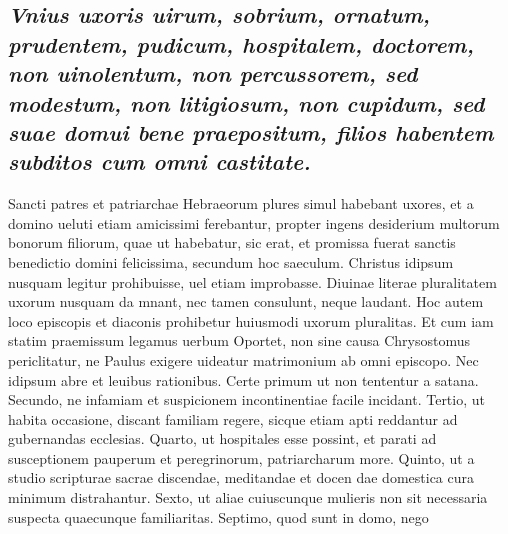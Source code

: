 \documentclass{article}
\begin{document}
\begin{pages}
\subsection*{\textit{Vnius uxoris uirum, sobrium, ornatum, prudentem, pudicum, hospitalem, doctorem, non uinolentum, non percussorem, sed modestum, non litigiosum, non cupidum, sed suae domui bene praepositum, filios habentem subditos cum omni castitate. }}\pstart Sancti patres et patriarchae Hebraeorum plures simul habebant uxores, et a domino ueluti etiam amicissimi ferebantur, propter ingens desiderium multorum bonorum filiorum, quae ut habebatur, sic erat, et promissa fuerat sanctis benedictio domini felicissima, secundum hoc saeculum. Christus idipsum nusquam legitur prohibuisse, uel etiam improbasse. Diuinae literae pluralitatem uxorum nusquam da mnant, nec tamen consulunt, neque laudant. Hoc autem loco episcopis et diaconis prohibetur huiusmodi uxorum pluralitas. Et cum iam statim praemissum legamus uerbum Oportet, non sine causa Chrysostomus periclitatur, ne Paulus exigere uideatur matrimonium ab omni episcopo. Nec idipsum abre et leuibus rationibus. Certe primum ut non tententur a satana. Secundo, ne infamiam et suspicionem incontinentiae facile incidant. Tertio, ut habita occasione, discant familiam regere, sicque etiam apti reddantur ad gubernandas ecclesias. Quarto, ut hospitales esse possint, et parati ad susceptionem pauperum et peregrinorum, patriarcharum more. Quinto, ut a studio scripturae sacrae discendae, meditandae et docen dae domestica cura minimum distrahantur. Sexto, ut aliae cuiuscunque mulieris non sit necessaria suspecta quaecunque familiaritas. Septimo, quod sunt in domo, nego  \pend

\end{pages}
\end{document}
